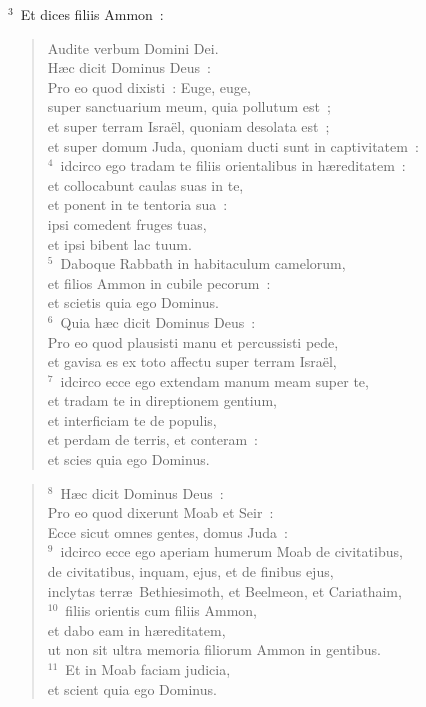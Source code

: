 ${}^{3}$~Et dices filiis Ammon~: \begin{flushleft}\begin{verse}Audite verbum Domini Dei.\\ H\ae c dicit Dominus Deus~:\\ Pro eo quod dixisti~: Euge, euge,\\ super sanctuarium meum, quia pollutum est~;\\ et super terram Isra\"el, quoniam desolata est~;\\ et super domum Juda, quoniam ducti sunt in captivitatem~:\\
${}^{4}$~idcirco ego tradam te filiis orientalibus in h\ae reditatem~:\\ et collocabunt caulas suas in te,\\ et ponent in te tentoria sua~:\\ ipsi comedent fruges tuas,\\ et ipsi bibent lac tuum.\\
${}^{5}$~Daboque Rabbath in habitaculum camelorum,\\ et filios Ammon in cubile pecorum~:\\ et scietis quia ego Dominus.\\
${}^{6}$~Quia h\ae c dicit Dominus Deus~:\\ Pro eo quod plausisti manu et percussisti pede,\\ et gavisa es ex toto affectu super terram Isra\"el,\\
${}^{7}$~idcirco ecce ego extendam manum meam super te,\\ et tradam te in direptionem gentium,\\ et interficiam te de populis,\\ et perdam de terris, et conteram~:\\ et scies quia ego Dominus.\end{verse}\end{flushleft}


\begin{flushleft}\begin{verse}${}^{8}$~H\ae c dicit Dominus Deus~:\\ Pro eo quod dixerunt Moab et Seir~:\\ Ecce sicut omnes gentes, domus Juda~:\\
${}^{9}$~idcirco ecce ego aperiam humerum Moab de civitatibus,\\ de civitatibus, inquam, ejus, et de finibus ejus,\\ inclytas terr\ae\ Bethiesimoth, et Beelmeon, et Cariathaim,\\
${}^{10}$~filiis orientis cum filiis Ammon,\\ et dabo eam in h\ae reditatem,\\ ut non sit ultra memoria filiorum Ammon in gentibus.\\
${}^{11}$~Et in Moab faciam judicia,\\ et scient quia ego Dominus.\end{verse}\end{flushleft}


